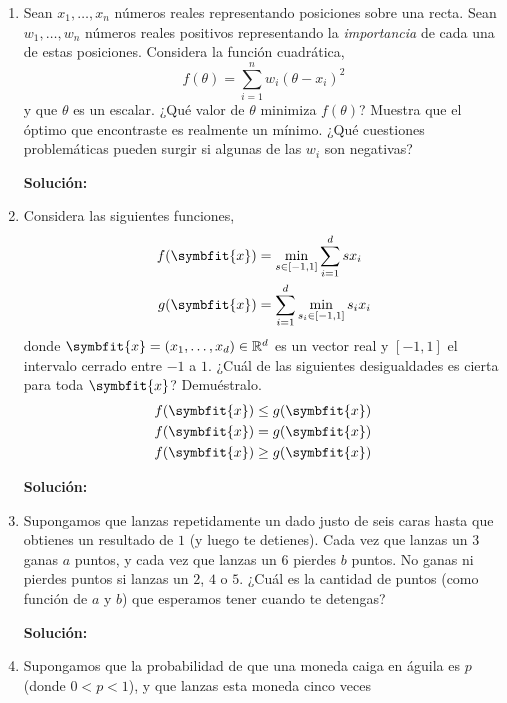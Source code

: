 \documentclass[11pt,letterpaper]{article}
\newenvironment{solution}{%
  \noindent\begin{shaded}
  \textbf{Solución:}\ }{
  \end{shaded}%
}
\newcommand{\bvec}[1]{\symbfit{#1}}
\begin{document}
\begin{enumerate}
\item%
  Sean \(x_1,\dots,x_n\) números reales representando posiciones sobre
  una recta.  Sean \(w_1,\dots,w_n\) números reales positivos
  representando la \emph{importancia} de cada una de estas
  posiciones. Considera la función cuadrática,
  \[ f(\theta) = \sum_{i=1}^n w_i\left(\theta-x_i\right)^2 \]
  y que \(\theta\) es un escalar. ¿Qué valor de \(\theta\) minimiza
  \(f(\theta)\)? Muestra que el óptimo que encontraste es realmente un
  mínimo. ¿Qué cuestiones problemáticas pueden surgir si algunas de
  las \(w_i\) son negativas?
  \begin{solution}
  \end{solution}
\item%
  Considera las siguientes funciones,
  \[
  \begin{aligned}
    f(\bvec{x}) &= \min_{s\in[-1,1]}\sum_{i=1}^d sx_i \\
    g(\bvec{x}) &= \sum_{i=1}^d \min_{s_i\in[-1,1]} s_ix_i
  \end{aligned}
  \]
  donde \(\bvec{x} = (x_1,\dots,x_d)\in\mathbb{R}^d\) es un
  vector real y \([-1,1]\) el intervalo cerrado entre \(-1\) a
  \(1\). ¿Cuál de las siguientes desigualdades es cierta para toda
  \(\bvec{x}\)?  Demuéstralo.
  \[
  \begin{aligned}
    f(\bvec{x}) &\leq g(\bvec{x}) \\
    f(\bvec{x}) &= g(\bvec{x}) \\
    f(\bvec{x}) &\geq g(\bvec{x})
  \end{aligned}
  \]
  \begin{solution}
  \end{solution}    
\item%
  Supongamos que lanzas repetidamente un dado justo de seis caras
  hasta que obtienes un resultado de \(1\) (y luego te detienes).
  Cada vez que lanzas un \(3\) ganas \(a\) puntos, y cada vez que
  lanzas un \(6\) pierdes \(b\) puntos.  No ganas ni pierdes puntos si
  lanzas un \(2\), \(4\) o \(5\).  ¿Cuál es la cantidad de puntos
  (como función de \(a\) y \(b\)) que esperamos tener cuando te
  detengas?
  \begin{solution}
  \end{solution}
\item%
  Supongamos que la probabilidad de que una moneda caiga en águila es
  \(p\) (donde \(0 < p < 1\)), y que lanzas esta moneda cinco veces

\end{enumerate}
\end{document}
